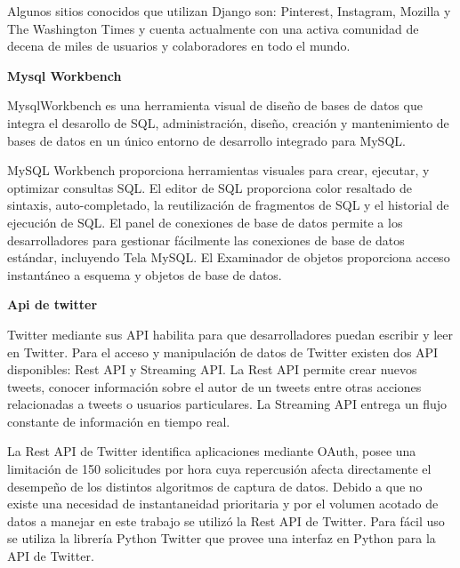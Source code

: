 	Algunos sitios conocidos que utilizan Django son: Pinterest, Instagram, Mozilla y The Washington Times y cuenta actualmente con una activa comunidad de decena de miles de usuarios y colaboradores en todo el mundo.
	
	\item \textbf{Mysql Workbench}
	
	MysqlWorkbench \cite{mysqlWorkbenchWeb} es una herramienta visual de diseño de bases de datos que integra el desarollo de SQL, administración, diseño, creación y mantenimiento de bases de datos en un único entorno de desarrollo integrado para MySQL.
	
	MySQL Workbench proporciona herramientas visuales para crear, ejecutar, y optimizar consultas SQL. El editor de SQL proporciona color resaltado de sintaxis, auto-completado, la reutilización de fragmentos de SQL y el historial de ejecución de SQL. El panel de conexiones de base de datos permite a los desarrolladores para gestionar fácilmente las conexiones de base de datos estándar, incluyendo Tela MySQL. El Examinador de objetos proporciona acceso instantáneo a esquema y objetos de base de datos.
	
	\item \textbf{Api de twitter}
	
	Twitter mediante sus API \cite{twitterWeb} habilita para que desarrolladores puedan escribir y leer en Twitter. Para el acceso y manipulación de datos de Twitter existen dos API disponibles: Rest API y Streaming API. La Rest API permite crear nuevos tweets, conocer información sobre el autor de un tweets entre otras acciones relacionadas a tweets o usuarios particulares. La Streaming API entrega un flujo constante de información en tiempo real.
	
	La Rest API de Twitter identifica aplicaciones mediante OAuth, posee una limitación de 150 solicitudes por hora cuya repercusión afecta directamente el desempeño de los distintos algoritmos de captura de datos. Debido a que no existe una necesidad de instantaneidad prioritaria y por el volumen acotado de datos a manejar en este trabajo se utilizó la Rest API de Twitter. Para fácil uso se utiliza la librería Python Twitter \cite{pythonTwitterCode} \cite{pythonTwitterGithub} que provee una interfaz en Python para la API de Twitter. 
	
	
